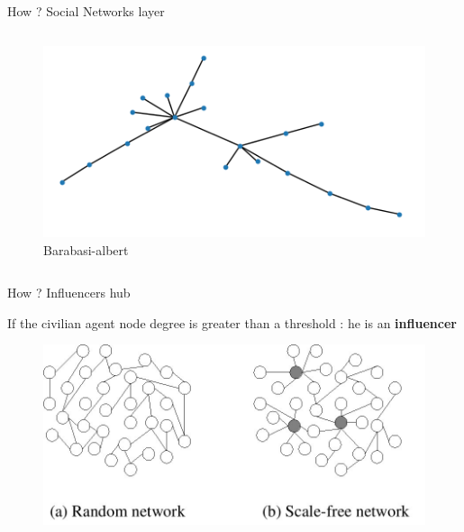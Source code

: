 \documentclass[10pt]{beamer}
\begin{document}
\begin{frame}{How ? Social Networks layer}
\begin{columns}
\begin{column}{0.3\textwidth}
                \begin{figure}
                    \centering
                    \includegraphics[width=\textwidth]{pictures/networks/barabasi_albert.png}
                    \caption{Barabasi-albert}
                \end{figure}
            \end{column}
        \end{columns}

    \end{frame}

    \begin{frame}{How ? Influencers hub}

        If the civilian agent node degree is greater than a threshold : he is an \textbf{influencer}

        \begin{figure}
            \centering
            \includegraphics[width=.75\textwidth]{pictures/networks/influencer_network.jpg}
        \end{figure}

    \end{frame}
\end{document}
